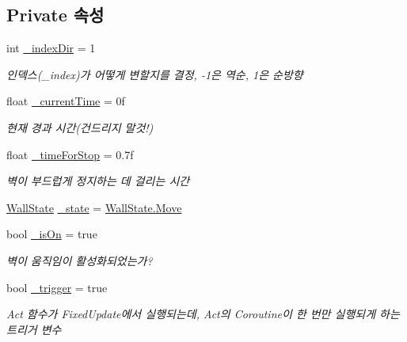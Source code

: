 \subsection*{Private 속성}
\begin{DoxyCompactItemize}
\item 
int \mbox{\hyperlink{class_moving_platform_a885973335ac91f8c34289d38f2d88d93}{\+\_\+index\+Dir}} = 1
\begin{DoxyCompactList}\small\item\em 인덱스(\+\_\+index)가 어떻게 변할지를 결정, -\/1은 역순, 1은 순방향 \end{DoxyCompactList}\item 
float \mbox{\hyperlink{class_moving_platform_a5c9c4e39da03c1aef1abde75a137831c}{\+\_\+current\+Time}} = 0f
\begin{DoxyCompactList}\small\item\em 현재 경과 시간(건드리지 말것!) \end{DoxyCompactList}\item 
float \mbox{\hyperlink{class_moving_platform_a69791dc347a05d5513e82cd445640cf4}{\+\_\+time\+For\+Stop}} = 0.\+7f
\begin{DoxyCompactList}\small\item\em 벽이 부드럽게 정지하는 데 걸리는 시간 \end{DoxyCompactList}\item 
\mbox{\hyperlink{class_moving_platform_ac47e764b71989317aab0bad26d82a901}{Wall\+State}} \mbox{\hyperlink{class_moving_platform_abd03a1d4800fd5fa8ab4ef8ce5a688db}{\+\_\+state}} = \mbox{\hyperlink{class_moving_platform_ac47e764b71989317aab0bad26d82a901a6bc362dbf494c61ea117fe3c71ca48a5}{Wall\+State.\+Move}}
\item 
bool \mbox{\hyperlink{class_moving_platform_a6721f91607e56294fb807a00ccfaafad}{\+\_\+is\+On}} = true
\begin{DoxyCompactList}\small\item\em 벽이 움직임이 활성화되었는가? \end{DoxyCompactList}\item 
bool \mbox{\hyperlink{class_moving_platform_a98e69f4b8bfe702ef2bc6a8d77a03b8a}{\+\_\+trigger}} = true
\begin{DoxyCompactList}\small\item\em Act 함수가 Fixed\+Update에서 실행되는데, Act의 Coroutine이 한 번만 실행되게 하는 트리거 변수 \end{DoxyCompactList}\end{DoxyCompactItemize}


